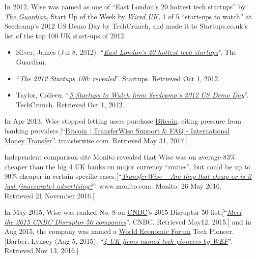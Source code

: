 \documentclass{book}
\numberwithin{equation}{section}
\begin{document}
%
In 2012, Wise was named as one of ``East London's 20 hottest tech startups'' by \href{https://en.wikipedia.org/wiki/The_Guardian}{\textit{The Guardian}}, Start Up of the Week by \href{https://en.wikipedia.org/wiki/Wired_UK}{\textit{Wired UK}}, 1 of 5 ``start-ups to watch'' at Seedcamp's 2012 US Demo Day by TechCrunch, and made it to Startups.co.uk's list of the top 100 UK start-ups of 2012.
\begin{itemize}
    \item Silver, James (Jul 8, 2012). ``\href{https://www.theguardian.com/uk/2012/jul/08/east-london-20-hottest-tech-companies}{\textit{East London's 20 hottest tech startups}}''. The Guardian.
    \item ``\href{http://www.startups.co.uk/transferwise-taavet-hinrikus-and-kristo-k%C3%A4%C3%A4rmann-startups-100.html}{\textit{The 2012 Startups 100: revealed}}''. Startups. Retrieved Oct 1, 2012.
    \item Taylor, Colleen. ``\href{https://techcrunch.com/2012/02/29/5-startups-to-watch-from-seedcamps-2012-us-demo-day-tctv/}{\textit{5 Startups to Watch from Seedcamp's 2012 US Demo Day}}''. TechCrunch. Retrieved Oct 1, 2012.
\end{itemize}
In Apr 2013, Wise stopped letting users purchase \href{https://en.wikipedia.org/wiki/Bitcoin}{Bitcoin}, citing pressure from banking providers.[``\href{https://transferwise.com/help/questions/2759169/bitcoin}{Bitcoin $|$ TransferWise Support \& FAQ - International Money Transfer}''. transferwise.com. Retrieved May 31, 2017.]

%
Independent comparison site Monito revealed that Wise was on average 83\% cheaper than the big 4 UK banks on major currency ``routes'', but could be up to 90\% cheaper in certain specific cases.[``\href{https://www.monito.com/blog/transferwise-cheaper-banks/}{\textit{TransferWise – Are they that cheap or is it just (inaccurate) advertising?}}''. www.monito.com. Monito. 26 May 2016. Retrieved 21 November 2016.]

%
In May 2015, Wise was ranked No. 8 on \href{https://en.wikipedia.org/wiki/CNBC}{CNBC}'s 2015 Disruptor 50 list,[``\href{https://www.cnbc.com/id/102609977}{\textit{Meet the 2015 CNBC Disruptor 50 companies}}''. CNBC. Retrieved May12, 2015.] and in Aug 2015, the company was named a \href{https://en.wikipedia.org/wiki/World_Economic_Forum}{World Economic Forum} Tech Pioneer.[Barber, Lynsey (Aug 5, 2015). ``\href{http://www.cityam.com/221702/world-economic-forum-tech-pioneers-transferwise-and-mike-lynchs-darktrace-among-four-uk-firms}{\textit{4 UK firms named tech pioneers by WEF}}''. Retrieved Nov 13, 2016.]
\end{document}
